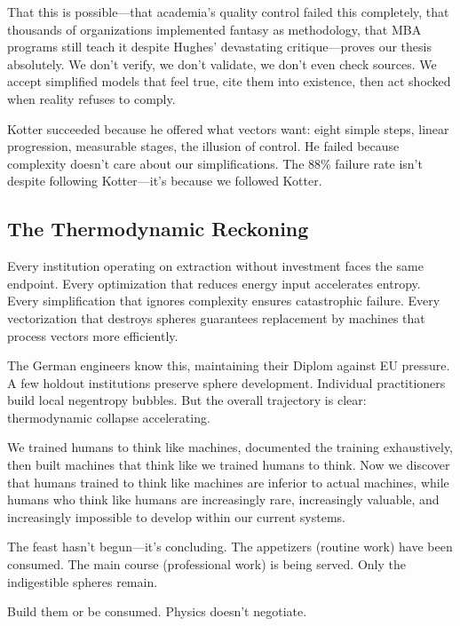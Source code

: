 That this is possible---that academia's quality control failed this completely, that thousands of organizations implemented fantasy as methodology, that MBA programs still teach it despite Hughes' devastating critique---proves our thesis absolutely. We don't verify, we don't validate, we don't even check sources. We accept simplified models that feel true, cite them into existence, then act shocked when reality refuses to comply.

Kotter succeeded because he offered what vectors want: eight simple steps, linear progression, measurable stages, the illusion of control. He failed because complexity doesn't care about our simplifications. The 88\% failure rate isn't despite following Kotter---it's because we followed Kotter.

\subsection{The Thermodynamic Reckoning}

Every institution operating on extraction without investment faces the same endpoint. Every optimization that reduces energy input accelerates entropy. Every simplification that ignores complexity ensures catastrophic failure. Every vectorization that destroys spheres guarantees replacement by machines that process vectors more efficiently.

The German engineers know this, maintaining their Diplom against EU pressure. A few holdout institutions preserve sphere development. Individual practitioners build local negentropy bubbles. But the overall trajectory is clear: thermodynamic collapse accelerating.

We trained humans to think like machines, documented the training exhaustively, then built machines that think like we trained humans to think. Now we discover that humans trained to think like machines are inferior to actual machines, while humans who think like humans are increasingly rare, increasingly valuable, and increasingly impossible to develop within our current systems.

The feast hasn't begun---it's concluding. The appetizers (routine work) have been consumed. The main course (professional work) is being served. Only the indigestible spheres remain.

Build them or be consumed. Physics doesn't negotiate.
